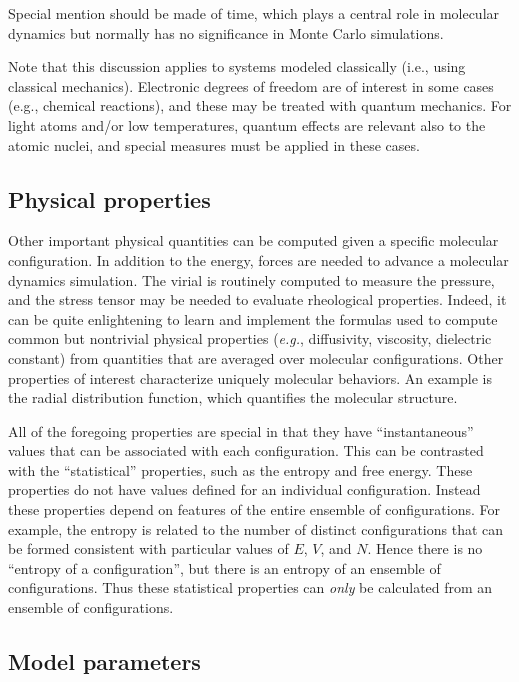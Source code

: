 \documentclass[9pt,bestpractices]{molsim}
\begin{document}
Special mention should be made of time, which plays a central role in
molecular dynamics but normally has no significance in Monte Carlo
simulations.

Note that this discussion applies to systems modeled
classically (i.e., using classical mechanics). Electronic degrees of freedom
are of interest in some cases (e.g., chemical reactions), and these may be
treated with quantum mechanics. For light atoms and/or low temperatures,
quantum effects are relevant also to the atomic nuclei, and special measures
must be applied in these cases.

\subsection{Physical properties}\label{properties}

Other important physical quantities can be computed given a specific
molecular configuration. In addition to the energy, forces are needed to advance a molecular dynamics simulation.
The virial is routinely computed to measure the pressure, and the stress
tensor may be needed to evaluate rheological properties. Indeed, it can
be quite enlightening to learn and implement the formulas used to
compute common but nontrivial physical properties (\emph{e.g.},
diffusivity, viscosity, dielectric constant) from quantities that are
averaged over molecular configurations. Other properties of interest
characterize uniquely molecular behaviors. An example is the radial
distribution function, which quantifies the molecular structure.

All of the foregoing properties are special in that they have
``instantaneous'' values that can be associated with each configuration.
This can be contrasted with the ``statistical'' properties, such as the
entropy and free energy. These properties do not have values
defined for an individual configuration. Instead these properties depend
on features of the entire ensemble of configurations. For example, the
entropy is related to the number of distinct configurations that can be
formed consistent with particular values of $E$, $V$, and $N$. Hence there is
no ``entropy of a configuration'', but there is an entropy of an
ensemble of configurations.
Thus these statistical properties can \emph{only} be calculated from an ensemble of configurations.

\subsection{Model parameters}\label{model-parameters}
\end{document}
